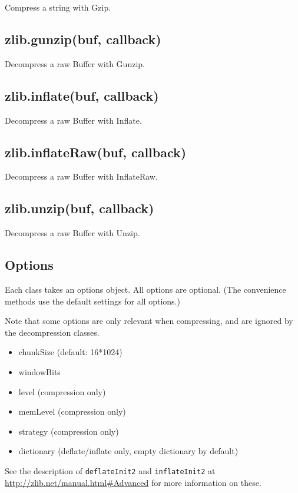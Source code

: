 Compress a string with Gzip.

\subsection{zlib.gunzip(buf, callback)}

Decompress a raw Buffer with Gunzip.

\subsection{zlib.inflate(buf, callback)}

Decompress a raw Buffer with Inflate.

\subsection{zlib.inflateRaw(buf, callback)}

Decompress a raw Buffer with InflateRaw.

\subsection{zlib.unzip(buf, callback)}

Decompress a raw Buffer with Unzip.

\subsection{Options}

Each class takes an options object. All options are optional. (The
convenience methods use the default settings for all options.)

Note that some options are only relevant when compressing, and are
ignored by the decompression classes.

\begin{itemize}
\item
  chunkSize (default: 16*1024)
\item
  windowBits
\item
  level (compression only)
\item
  memLevel (compression only)
\item
  strategy (compression only)
\item
  dictionary (deflate/inflate only, empty dictionary by default)
\end{itemize}

See the description of \texttt{deflateInit2} and \texttt{inflateInit2}
at \url{http://zlib.net/manual.html#Advanced} for more information on
these.

